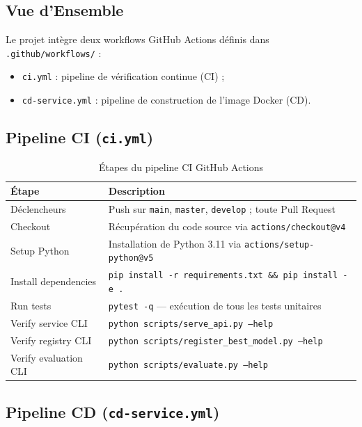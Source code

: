 \documentclass{rapportENSIAS}
\newcommand{\projectpath}[1]{\texttt{#1}}
\begin{document}
\subsection{Vue d'Ensemble}

Le projet intègre deux workflows GitHub Actions définis dans
\projectpath{.github/workflows/} :

\begin{itemize}
    \item \projectpath{ci.yml} : pipeline de vérification continue (CI) ;
    \item \projectpath{cd-service.yml} : pipeline de construction de l'image Docker (CD).
\end{itemize}

\subsection{Pipeline CI (\texttt{ci.yml})}

\begin{table}[H]
\centering
\caption{Étapes du pipeline CI GitHub Actions}
\label{tab:ci_pipeline}
\begin{tabular}{p{4cm} p{10cm}}
\toprule
\textbf{Étape} & \textbf{Description} \\
\midrule
Déclencheurs
  & Push sur \texttt{main}, \texttt{master}, \texttt{develop} ;
    toute Pull Request \\
\midrule
Checkout
  & Récupération du code source via \texttt{actions/checkout@v4} \\
\midrule
Setup Python
  & Installation de Python 3.11 via \texttt{actions/setup-python@v5} \\
\midrule
Install dependencies
  & \texttt{pip install -r requirements.txt \&\& pip install -e .} \\
\midrule
Run tests
  & \texttt{pytest -q} --- exécution de tous les tests unitaires \\
\midrule
Verify service CLI
  & \texttt{python scripts/serve\_api.py --help} \\
\midrule
Verify registry CLI
  & \texttt{python scripts/register\_best\_model.py --help} \\
\midrule
Verify evaluation CLI
  & \texttt{python scripts/evaluate.py --help} \\
\bottomrule
\end{tabular}
\end{table}

\subsection{Pipeline CD (\texttt{cd-service.yml})}
\end{document}
